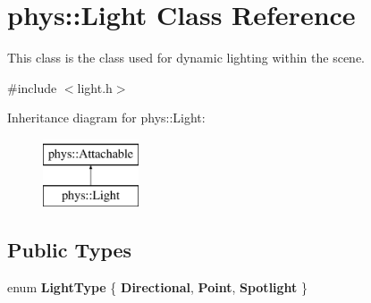 \hypertarget{classphys_1_1Light}{
\section{phys::Light Class Reference}
\label{dc/df1/classphys_1_1Light}
}


This class is the class used for dynamic lighting within the scene.  




{\ttfamily \#include $<$light.h$>$}

Inheritance diagram for phys::Light:\begin{figure}[H]
\begin{center}
\leavevmode
\includegraphics[height=2cm]{dc/df1/classphys_1_1Light}
\end{center}
\end{figure}
\subsection*{Public Types}
\begin{DoxyCompactItemize}
\item 
enum {\bfseries LightType} \{ {\bfseries Directional}, 
{\bfseries Point}, 
{\bfseries Spotlight}
 \}
\end{DoxyCompactItemize}
